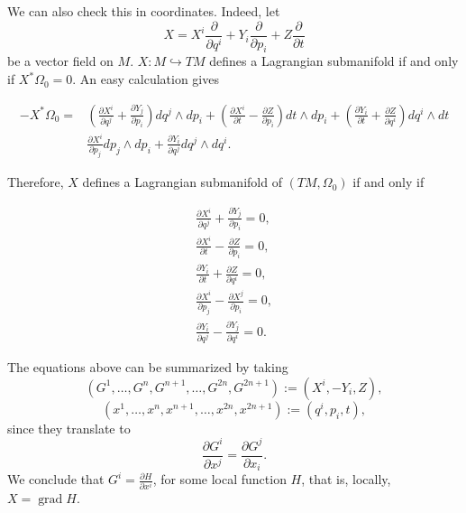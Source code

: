 \documentclass[12pt]{article}
\newcommand{\grad}{\operatorname{grad}}
\newcommand{\partder}[2]{\frac{\partial #1}{\partial #2}}
\begin{document}
We can also check this in coordinates. Indeed, let $$X = X^i \partder{}{q^i} + Y_i \partder{}{p_i} + Z \partder{}{t}$$ be a vector field on $M$. $X: M \hookrightarrow TM$ defines a Lagrangian submanifold if and only if $X^*\Omega_0 = 0.$ An easy calculation gives 

\begin{align*}
    -X^*\Omega_0 =& \left ( \partder{X^i}{q^j} + \partder{Y_j}{p_i}\right ) dq^j \wedge dp_i +   \left ( \partder{X^i}{t} - \partder{Z}{p_i}\right ) dt \wedge dp_i +  \left ( \partder{Y_i}{t} + \partder{Z}{q^i}\right ) dq^i \wedge dt\\
   &  \partder{X^i}{p_j}  dp_j \wedge dp_i +  \partder{Y_i}{q^j} dq^j \wedge dq^i.
\end{align*}

Therefore, $X$ defines a Lagrangian submanifold of $(TM, \Omega_0)$ if and only if 

\begin{align}
    \label{1} \partder{X^i}{q^j} + \partder{Y_j}{p_i} = 0, \\ \label{2}\partder{X^i}{t} - \partder{Z}{p_i} = 0,\\ \label{3}\partder{Y_i}{t} + \partder{Z}{q^i} = 0, \\
    \label{4}\partder{X^i}{p_j} - \partder{X^j}{p_i} = 0, \\ \label{5}\partder{Y_i}{q^j} - \partder{Y_j}{q^i} = 0.
\end{align}

The equations above can be summarized by taking $$(G^1, \dots, G^n, G^{n+1} , \dots, G^{2n}, G^{2n +1}) := (X^i, - Y_i, Z),$$ $$(x^1, \dots, x^n, x^{n+1}, \dots, x^{2n}, x^{2n +1}) := (q^i, p_i, t),$$ since they translate to $$\partder{G^i}{x^j} = \partder{G^j}{x_i}.$$ We conclude that $G^i =  \displaystyle \partder{H}{x^i}$, for some local function $H$, that is, locally, $X = \grad H$.\\
\end{document}
